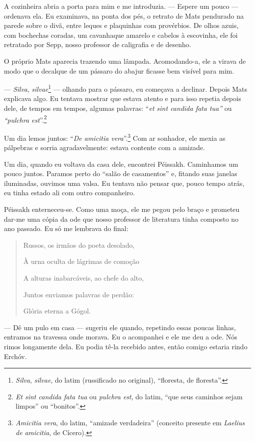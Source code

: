 A cozinheira abria a porta para mim e me introduzia. --- Espere um pouco
--- ordenava ela. Eu examinava, na ponta dos pés, o retrato de Mats
pendurado na parede sobre o divã, entre leques e plaquinhas com
provérbios. De olhos azuis, com bochechas coradas, um cavanhaque amarelo
e cabelos à escovinha, ele foi retratado por Sepp, nosso professor de
caligrafia e de desenho.

O próprio Mats aparecia trazendo uma lâmpada. Acomodando-a, ele a virava
de modo que o decalque de um pássaro do abajur ficasse bem visível para
mim.

--- \emph{Silva}, \emph{silvae}\footnote{\emph{Silva}, \emph{silvae}, do
  latim (russificado no original), ``floresta, de floresta''.} ---
olhando para o pássaro, eu começava a declinar. Depois Mats explicava
algo. Eu tentava mostrar que estava atento e para isso repetia depois
dele, de tempos em tempos, algumas palavras: ``\emph{et sint candida
fata tua''} ou \emph{``pulchra est}''.\footnote{\emph{Et sint candida
  fata tua} ou \emph{pulchra est}, do latim, ``que seus caminhos sejam
  limpos'' ou ``bonitos''.}

Um dia lemos juntos: ``\emph{De amicitia vera}''.\footnote{\emph{Amicitia
  vera}, do latim, ``amizade verdadeira'' (conceito presente em
  \emph{Laelius de amicitia}, de Cícero).} Com ar sonhador, ele mexia as
pálpebras e sorria agradavelmente: estava contente com a amizade.

Um dia, quando eu voltava da casa dele, encontrei Péissakh. Caminhamos
um pouco juntos. Paramos perto do ``salão de casamentos'' e, fitando
suas janelas iluminadas, ouvimos uma valsa. Eu tentava não pensar que,
pouco tempo atrás, eu tinha estado ali com outro companheiro.

Péissakh enterneceu-se. Como uma moça, ele me pegou pelo braço e
prometeu dar-me uma cópia da ode que nosso professor de literatura tinha
composto no ano passado. Eu só me lembrava do final:

\begin{quotation}
Russos, os irmãos do poeta desolado,

À urna oculta de lágrimas de comoção

A alturas inabarcáveis, ao chefe do alto,

Juntos enviamos palavras de perdão:

Glória eterna a Gógol.
\end{quotation}

--- Dê um pulo em casa --- sugeriu ele quando, repetindo essas poucas
linhas, entramos na travessa onde morava. Eu o acompanhei e ele me deu a
ode. Nós rimos longamente dela. Eu podia tê-la recebido antes, então
comigo estaria rindo Erchóv.

